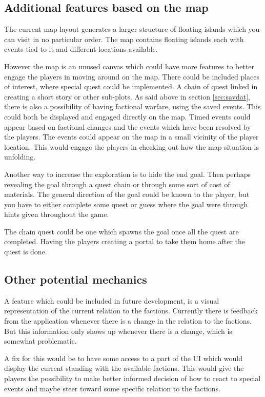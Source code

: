 \subsection{Additional features based on the map}
The current map layout generates a larger structure of floating islands which you can visit in no particular order. The map contains floating islands each with events tied to it and different locations available.

However the map is an unused canvas which could have more features to better engage the players in moving around on the map. 
There could be included places of interest, where special quest could be implemented. A chain of quest linked in creating a short story or other sub-plots. 
As said above in section \ref{sec:savdat}, there is also a possibility of having factional warfare, using the saved events. This could both be displayed and engaged directly on the map. 
Timed events could appear based on factional changes and the events which have been resolved by the players. The events could appear on the map in a small vicinity of the player location. This would engage the players in checking out how the map situation is unfolding. 

Another way to increase the exploration is to hide the end goal. Then perhaps revealing the goal through a quest chain or through some sort of cost of materials. The general direction of the goal could be known to the player, but you have to either complete some quest or guess where the goal were through hints given throughout the game.

The chain quest could be one which spawns the goal once all the quest are completed. Having the players creating a portal to take them home after the quest is done.
\subsection{Other potential mechanics}
A feature which could be included in future development, is a visual representation of the current relation to the factions.
Currently there is feedback from the application whenever there is a change in the relation to the factions. But this information only shows up whenever there is a change, which is somewhat problematic. 

A fix for this would be to have some access to a part of the UI which would display the current standing with the available factions. This would give the players the possibility to make better informed decision of how to react to special events and maybe steer toward some specific relation to the factions.

